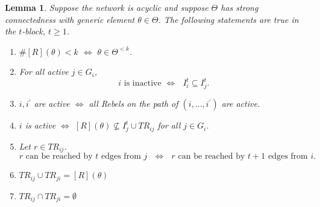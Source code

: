 \documentclass[12pt,letter]{article}
\newtheorem{lemma}{Lemma}[section]
\theoremstyle{definition}
\theoremstyle{definition}
\theoremstyle{remark}
\theoremstyle{claim}
\begin{document}
\begin{lemma} Suppose the network is acyclic and suppose $\Theta$ has strong connectedness with generic element $\theta\in \Theta$. The following statements are true in the $t$-block, $t\geq 1$.
\begin{enumerate}
\item $\#[R](\theta)<k$ $\Leftrightarrow$ $\theta\in\Theta^{<k}$.
\item For all active $j\in G_i$,
\[\text{$i$ is inactive $\Leftrightarrow$ $I^t_i\subseteq I^t_{j}$}.\]
\item $i,i^{'}$ are active $\Leftrightarrow$ all Rebels on the path of $(i,...,i^{'})$ are active.
\item $i$ is active $\Leftrightarrow$ $[R](\theta)\not\subseteq I^t_j\cup TR_{ij}$ for all $j\in G_i$.
\item Let $r\in TR_{ij}$.
\[\text{$r$ can be reached by $t$ edges from $j$ $\Leftrightarrow$ $r$ can be reached by $t+1$ edges from $i$.}\]
\item $TR_{ij}\cup TR_{ji}=[R](\theta)$
\item $TR_{ij}\cap TR_{ji}=\emptyset$
\end{enumerate}
 
\end{lemma}
\end{document}
